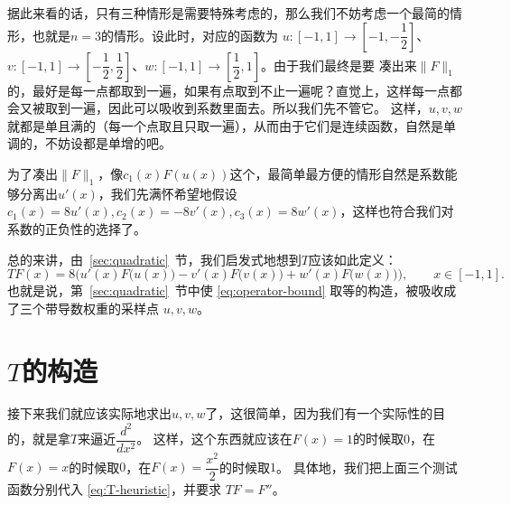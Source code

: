\documentclass[UTF8,fontset=windows,a4paper,11pt]{ctexart}
\newcommand{\Lone}[1]{\lVert #1\rVert_1}
\begin{document}
据此来看的话，只有三种情形是需要特殊考虑的，那么我们不妨考虑一个最简的情形，也就是$n=3$的情形。设此时，对应的函数为
$u:[-1,1]\to[-1,-\dfrac{1}{2}]$、$v:[-1,1]\to[-\dfrac{1}{2},\dfrac{1}{2}]$、$w:[-1,1]\to[\dfrac{1}{2},1]$。由于我们最终是要
凑出来$\Lone{F}$的，最好是每一点都取到一遍，如果有点取到不止一遍呢？直觉上，这样每一点都会又被取到一遍，因此可以吸收到系数里面去。所以我们先不管它。
这样，$u,v,w$就都是单且满的（每一个点取且只取一遍），从而由于它们是连续函数，自然是单调的，不妨设都是单增的吧。

为了凑出$\Lone{F}$，像$c_1(x)F(u(x))$这个，最简单最方便的情形自然是系数能够分离出$u'(x)$，我们先满怀希望地假设$c_1(x)=8u'(x), c_2(x)=-8v'(x), c_3(x)=8w'(x)$，这样也符合我们对系数的正负性的选择了。

总的来讲，由~\ref{sec:quadratic}~节，我们启发式地想到$T$应该如此定义：
\begin{equation}
    TF(x)
    =8\Big(u'(x)F\big(u(x)\big)-v'(x)F\big(v(x)\big)+w'(x)F\big(w(x)\big)\Big),
    \qquad x\in[-1,1].
    \label{eq:T-heuristic}
\end{equation}
也就是说，第~\ref{sec:quadratic}~节中使 \eqref{eq:operator-bound} 取等的构造，被吸收成了三个带导数权重的采样点 $u,v,w$。

\section{$T$的构造}
\label{sec:construction}
接下来我们就应该实际地求出$u,v,w$了，这很简单，因为我们有一个实际性的目的，就是拿$T$来逼近$\dfrac{d^2}{dx^2}$。
这样，这个东西就应该在$F(x)=1$的时候取$0$，在$F(x)=x$的时候取$0$，在$F(x)=\dfrac{x^2}{2}$的时候取$1$。
具体地，我们把上面三个测试函数分别代入 \eqref{eq:T-heuristic}，并要求 $TF=F''$。
\end{document}
